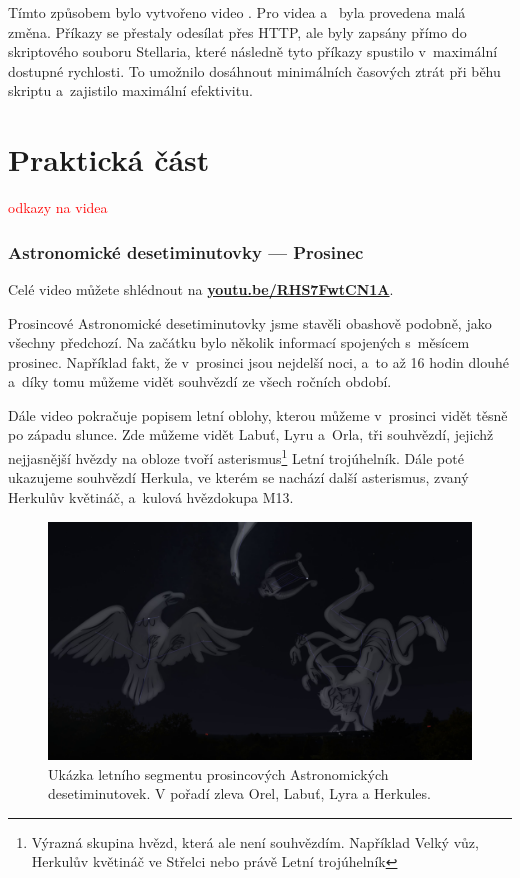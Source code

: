\documentclass[12pt,a4paper,titlepage]{article}
\newcommand{\link}[2]{\href{#1}{\textcolor{link-color}{\textbf{#2}}}}%
\newcommand{\todo}[1]{\textcolor{red}{#1}}
\begin{document}
Tímto způsobem bylo vytvořeno video . Pro videa  a~ byla provedena malá změna. Příkazy se přestaly odesílat přes HTTP, ale byly zapsány přímo do skriptového souboru Stellaria, které následně tyto příkazy spustilo v~maximální dostupné rychlosti. To umožnilo dosáhnout minimálních časových ztrát při běhu skriptu a~zajistilo maximální efektivitu.
\newpage
\part{Praktická část}
\todo{odkazy na videa}
\section{Astronomické desetiminutovky --- Prosinec}
Celé video můžete shlédnout na \link{https://youtu.be/RHS7FwtCN1A}{youtu.be/RHS7FwtCN1A}.

Prosincové Astronomické desetiminutovky jsme stavěli obashově podobně, jako všechny předchozí. Na začátku bylo několik informací spojených s~měsícem prosinec. Například fakt, že v~prosinci jsou nejdelší noci, a~to až 16 hodin dlouhé a~díky tomu můžeme vidět souhvězdí ze všech ročních období. 

Dále video pokračuje popisem letní oblohy, kterou můžeme v~prosinci vidět těsně po západu slunce. Zde můžeme vidět Labuť, Lyru a~Orla, tři souhvězdí, jejichž nejjasnější hvězdy na obloze tvoří asterismus\footnote{Výrazná skupina hvězd, která ale není souhvězdím. Například Velký vůz, Herkulův květináč ve Střelci nebo právě Letní trojúhelník} Letní trojúhelník. Dále poté ukazujeme souhvězdí Herkula, ve kterém se nachází další asterismus, zvaný Herkulův květináč, a~kulová hvězdokupa M13.

\begin{figure}[H]
	\centering
	\includegraphics[width=.95\textwidth]{ac12_leto.png}
	\caption{Ukázka letního segmentu prosincových Astronomických desetiminutovek. V pořadí zleva Orel, Labuť, Lyra a Herkules.}\label{prac:ac12_leto}
\end{figure}
\end{document}
